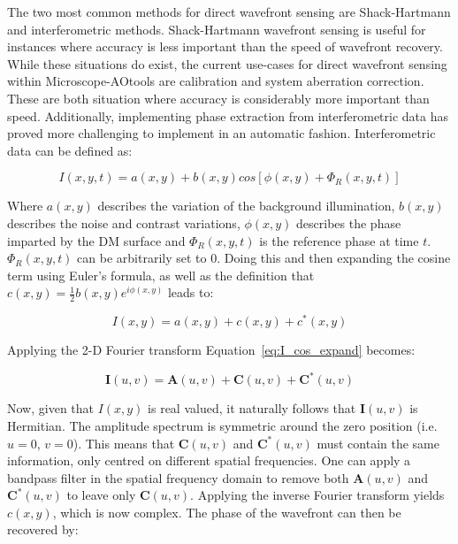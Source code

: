 The two most common methods for direct wavefront sensing are Shack-Hartmann and interferometric methods. Shack-Hartmann wavefront sensing is useful for instances where accuracy is less important than the speed of wavefront recovery. While these situations do exist, the current use-cases for direct wavefront sensing within Microscope-AOtools are calibration and system aberration correction. These are both situation where accuracy is considerably more important than speed. Additionally, implementing phase extraction from interferometric data has proved more challenging  to implement in an automatic fashion. Interferometric data can be defined as:

\begin{equation}\label{eq:I_basic}
I(x,y,t) = a(x,y) + b(x,y)cos[\phi(x,y) + \Phi_{R}(x,y,t)]
\end{equation}

Where $a(x,y)$ describes the variation of the background illumination, $b(x,y)$ describes the noise and contrast variations, $\phi(x,y)$ describes the phase imparted by the DM surface and $\Phi_{R}(x,y,t)$ is the reference phase at time $t$. $\Phi_{R}(x,y,t)$ can be arbitrarily set to 0. Doing this and then expanding the cosine term using Euler's formula, as well as the definition that $c(x,y) = \frac{1}{2}b(x,y)e^{i\phi(x,y)}$ leads to:

\begin{equation}\label{eq:I_cos_expand}
I(x,y) = a(x,y) + c(x,y) + c^{*}(x,y)
\end{equation}

Applying the 2-D Fourier transform Equation~\ref{eq:I_cos_expand} becomes:

\begin{equation}\label{eq:I_fourier}
\boldsymbol{I}(u,v) = \boldsymbol{A}(u,v) + \boldsymbol{C}(u,v) + \boldsymbol{C}^{*}(u,v)
\end{equation}

Now, given that $I(x,y)$ is real valued, it naturally follows that $\boldsymbol{I}(u,v)$ is Hermitian. The amplitude spectrum is symmetric around the zero position (i.e. $u = 0$, $v = 0$). This means that $\boldsymbol{C}(u,v)$ and $\boldsymbol{C}^{*}(u,v)$ must contain the same information, only centred on different spatial frequencies. One can apply a bandpass filter in the spatial frequency domain to remove both $\boldsymbol{A}(u,v)$ and $\boldsymbol{C}^{*}(u,v)$ to leave only $\boldsymbol{C}(u,v)$.\cite{lewis1993absolute} Applying the inverse Fourier transform yields $c(x,y)$, which is now complex. The phase of the wavefront can then be recovered by:

